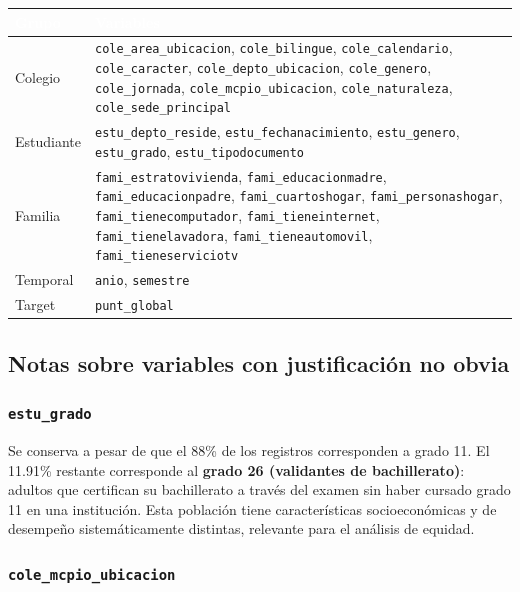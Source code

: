 \documentclass[12pt, a4paper]{article}
\newcommand{\thead}[1]{\cellcolor{tabheader}\textcolor{white}{\textbf{#1}}}
\begin{document}
\vspace{4pt}
\begin{tabularx}{\textwidth}{l X}
  \toprule
  \thead{Grupo} & \thead{Variables} \\
  \midrule
  \rowcolor{rowalt}
  Colegio     & \texttt{cole\_area\_ubicacion}, \texttt{cole\_bilingue},
                \texttt{cole\_calendario}, \texttt{cole\_caracter},
                \texttt{cole\_depto\_ubicacion}, \texttt{cole\_genero},
                \texttt{cole\_jornada}, \texttt{cole\_mcpio\_ubicacion},
                \texttt{cole\_naturaleza}, \texttt{cole\_sede\_principal} \\
  Estudiante  & \texttt{estu\_depto\_reside}, \texttt{estu\_fechanacimiento},
                \texttt{estu\_genero}, \texttt{estu\_grado},
                \texttt{estu\_tipodocumento} \\
  \rowcolor{rowalt}
  Familia     & \texttt{fami\_estratovivienda}, \texttt{fami\_educacionmadre},
                \texttt{fami\_educacionpadre}, \texttt{fami\_cuartoshogar},
                \texttt{fami\_personashogar}, \texttt{fami\_tienecomputador},
                \texttt{fami\_tieneinternet}, \texttt{fami\_tienelavadora},
                \texttt{fami\_tieneautomovil}, \texttt{fami\_tieneserviciotv} \\
  Temporal    & \texttt{anio}, \texttt{semestre} \\
  \rowcolor{rowalt}
  Target      & \texttt{punt\_global} \\
  \bottomrule
\end{tabularx}

\subsection{Notas sobre variables con justificación no obvia}

\subsubsection{\texttt{estu\_grado}}

Se conserva a pesar de que el 88\% de los registros corresponden a grado 11.
El 11.91\% restante corresponde al \textbf{grado 26 (validantes de bachillerato)}:
adultos que certifican su bachillerato a través del examen sin haber cursado
grado 11 en una institución. Esta población tiene características socioeconómicas
y de desempeño sistemáticamente distintas, relevante para el análisis de equidad.

\subsubsection{\texttt{cole\_mcpio\_ubicacion}}
\end{document}
